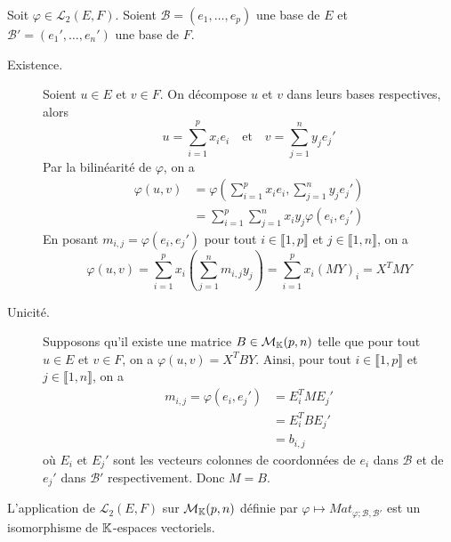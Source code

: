 \documentclass[a4paper,12pt]{article}
\begin{document}
\begin{demonstration}
    Soit $\varphi \in \mathcal{L}_2(E, F)$. Soient $\mathscr{B} = (e_1, \dots, e_p)$ une base de $E$ et $\mathscr{B'} = (e_1', \dots, e_n')$ une base de $F$.
    \begin{description}
        \item[Existence.] Soient $u \in E$ et $v \in F$. On décompose $u$ et $v$ dans leurs bases respectives, alors
        $$
        u = \sum_{i=1}^p x_i e_i \quad \text{et} \quad v = \sum_{j=1}^n y_j e_j'
        $$
        Par la bilinéarité de $\varphi$, on a
        \begin{align*}
            \varphi(u, v) &= \varphi(\sum_{i=1}^p x_i e_i, \sum_{j=1}^n y_j e_j') \\
            &= \sum_{i=1}^p \sum_{j=1}^n x_i y_j \varphi(e_i, e_j')
        \end{align*}
        En posant $m_{i, j} = \varphi(e_i, e_j')$ pour tout $i \in \llbracket 1, p \rrbracket$ et $j \in \llbracket 1, n \rrbracket$, on a
        $$
        \varphi(u, v) = \sum_{i=1}^p x_i \left( \sum_{j=1}^n m_{i, j} y_j \right) = \sum_{i=1}^p x_i (M Y)_i = X^T M Y
        $$

        \item[Unicité.] Supposons qu'il existe une matrice $B \in \mathcal{M}_{\mathbb{K}}(p, n)$ telle que pour tout $u \in E$ et $v \in F$, on a $\varphi(u, v) = X^T B Y$.
        Ainsi, pour tout $i \in \llbracket 1, p \rrbracket$ et $j \in \llbracket 1, n \rrbracket$, on a
        \begin{align*}
            m_{i, j} = \varphi(e_i, e_j') &= E_i^T M E_j' \\
            &= E_i^T B E_j' \\
            &= b_{i, j}
        \end{align*}
        où $E_i$ et $E_j'$ sont les vecteurs colonnes de coordonnées de $e_i$ dans $\mathscr{B}$ et de $e_j'$ dans $\mathscr{B'}$ respectivement. Donc $M = B$.
    \end{description}
\end{demonstration}

\begin{proposition}{}{}
    L'application de $\mathcal{L}_2(E, F)$ sur $\mathcal{M}_{\mathbb{K}}(p, n)$ définie par $\varphi \mapsto Mat_{\varphi; \mathscr{B}, \mathscr{B'}}$ est un isomorphisme de $\mathbb{K}$-espaces vectoriels.
\end{proposition}
\end{document}
